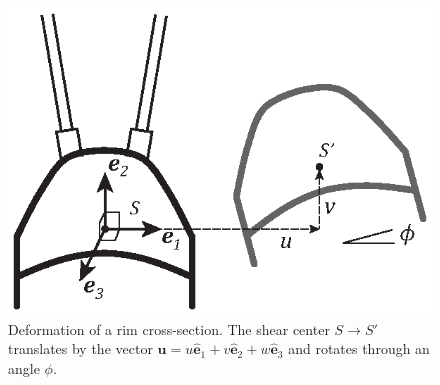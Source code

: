 \documentclass{bmd2016p}
\begin{document}
\begin{figure}[!ht]
\centering
\includegraphics[scale=1.0]{figures/bmd_figures-06.eps}
\caption{Deformation of a rim cross-section. The shear center $S\rightarrow S'$ translates by the vector $\bm{u} = u\hat{\bm{e}}_1 + v\hat{\bm{e}}_2 + w\hat{\bm{e}}_3$ and rotates through an angle $\phi$.}
\label{fig:def}
\end{figure}
\end{document}
